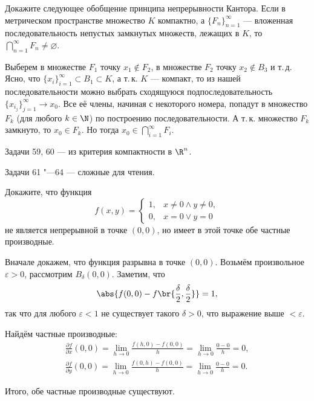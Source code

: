 \begin{problem}[58]
    Докажите следующее обобщение принципа непрерывности Кантора. Если в метрическом пространстве множество $K$ компактно, а $\{F_n\}_{n = 1}^\infty$ --- вложенная последовательность непустых замкнутых множеств, лежащих в $K$, то $\bigcap\limits_{n = 1}^\infty F_n \ne \varnothing$.
\end{problem}

\begin{solution}
    Выберем в множестве $F_1$ точку $x_1 \notin F_2$, в множестве $F_2$ точку $x_2 \notin B_3$ и т.\,д. Ясно, что $\{x_i\}_{i = 1}^\infty \subset B_1 \subset K$, а т.\,к. $K$ --- компакт, то из нашей последовательности можно выбрать сходящуюся подпоследовательность $\{x_{i_j}\}_{j = 1}^\infty \to x_0$. Все её члены, начиная с некоторого номера, попадут в множество $F_k$ (для любого $k \in \N$) по построению последовательности. А т.\,к. множество $F_k$ замкнуто, то $x_0 \in F_k$. Но тогда $x_0 \in \bigcap\limits_{i = 1}^\infty F_i$.
\end{solution}

Задачи 59, 60 --- из критерия компактности в $\R^n$.

Задачи 61 "---64 --- сложные для чтения.

\begin{problem}[65$^\circ$]
    Докажите, что функция
    \[
        f(x, y) =
        \begin{cases}
            1,& x \ne 0 \wedge y \ne 0,\\
            0,& x = 0 \vee y = 0
        \end{cases}
    \]
    не является непрерывной в точке $(0, 0)$, но имеет в этой точке обе частные производные.
\end{problem}

\begin{solution}
    Вначале докажем, что функция разрывна в точке $(0, 0)$. Возьмём произвольное $\varepsilon > 0$, рассмотрим $B_\delta(0, 0)$. Заметим, что
    \[
        \abs{f(0, 0) - f\br{\frac{\delta}{2}, \frac{\delta}{2}}} = 1,
    \]
    так что для любого $\varepsilon < 1$ не существует такого $\delta > 0$, что выражение выше $< \varepsilon$.

    Найдём частные производные:
    \begin{gather*}
        \frac{\partial f}{\partial x}(0, 0) = \lim_{h \to 0}\frac{f(h, 0) - f(0, 0)}{h} = \lim_{h \to 0}\frac{0 - 0}{h} = 0,\\
        \frac{\partial f}{\partial y}(0, 0) = \lim_{h \to 0}\frac{f(0, h) - f(0, 0)}{h} = \lim_{h \to 0}\frac{0 - 0}{h} = 0.
    \end{gather*}

    Итого, обе частные производные существуют.
\end{solution}

